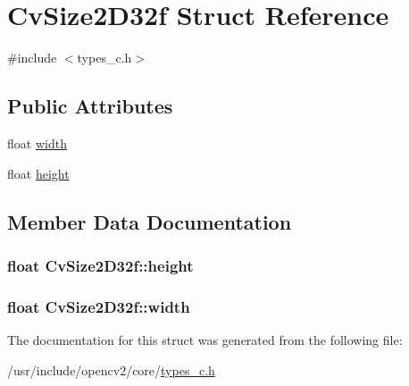 \hypertarget{structCvSize2D32f}{\section{Cv\-Size2\-D32f Struct Reference}
\label{structCvSize2D32f}
}


{\ttfamily \#include $<$types\-\_\-c.\-h$>$}

\subsection*{Public Attributes}
\begin{DoxyCompactItemize}
\item 
float \hyperlink{structCvSize2D32f_a65e364dc685112d8c101f6ec50bfc9bd}{width}
\item 
float \hyperlink{structCvSize2D32f_ac791b8ca0bcac27047a2021e68166c62}{height}
\end{DoxyCompactItemize}


\subsection{Member Data Documentation}
\hypertarget{structCvSize2D32f_ac791b8ca0bcac27047a2021e68166c62}{
\subsubsection[{height}]{\setlength{\rightskip}{0pt plus 5cm}float Cv\-Size2\-D32f\-::height}}\label{structCvSize2D32f_ac791b8ca0bcac27047a2021e68166c62}
\hypertarget{structCvSize2D32f_a65e364dc685112d8c101f6ec50bfc9bd}{
\subsubsection[{width}]{\setlength{\rightskip}{0pt plus 5cm}float Cv\-Size2\-D32f\-::width}}\label{structCvSize2D32f_a65e364dc685112d8c101f6ec50bfc9bd}


The documentation for this struct was generated from the following file\-:\begin{DoxyCompactItemize}
\item 
/usr/include/opencv2/core/\hyperlink{core_2types__c_8h}{types\-\_\-c.\-h}\end{DoxyCompactItemize}
